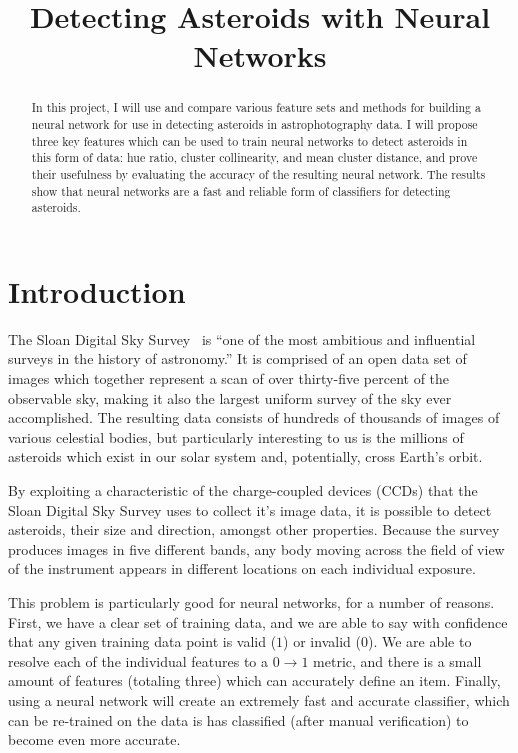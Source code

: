 \documentclass[conference]{IEEEtran}
\begin{document}
\title{Detecting Asteroids with Neural Networks}

\author{
}

\maketitle

\begin{abstract}
In this project, I will use and compare various feature sets and methods for
building a neural network for use in detecting asteroids in astrophotography
data. I will propose three key features which can be used to train neural
networks to detect asteroids in this form of data: hue ratio, cluster
collinearity, and mean cluster distance, and prove their usefulness by
evaluating the accuracy of the resulting neural network. The results show that
neural networks are a fast and reliable form of classifiers for detecting
asteroids.
\end{abstract}

\section{Introduction}
The Sloan Digital Sky Survey~\cite{Gunn92thesloan} is ``one of the most
ambitious and influential surveys in the history of astronomy.'' It is
comprised of an open data set of images which together represent a scan of over
thirty-five percent of the observable sky, making it also the largest uniform
survey of the sky ever accomplished. The resulting data consists of hundreds of
thousands of images of various celestial bodies, but particularly interesting to
us is the millions of asteroids which exist in our solar system and,
potentially, cross Earth's orbit.

By exploiting a characteristic of the charge-coupled devices (CCDs) that the
Sloan Digital Sky Survey uses to collect it's image data, it is possible to
detect asteroids, their size and direction, amongst other properties. Because
the survey produces images in five different bands, any body moving across the
field of view of the instrument appears in different locations on each
individual exposure.

This problem is particularly good for neural networks, for a number of reasons.
First, we have a clear set of training data, and we are able to say with
confidence that any given training data point is valid ($1$) or invalid ($0$).
We are able to resolve each of the individual features to a $0 \to 1$ metric,
and there is a small amount of features (totaling three) which can accurately
define an item. Finally, using a neural network will create an extremely fast
and accurate classifier, which can be re-trained on the data is has classified
(after manual verification) to become even more accurate.
\end{document}
